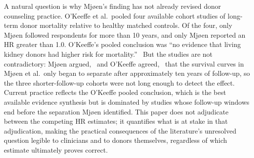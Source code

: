 A natural question is why Mjøen's finding has not already revised donor counseling practice. O'Keeffe et al.\ pooled four available cohort studies of long-term donor mortality relative to healthy matched controls. Of the four, only Mjøen followed respondents for more than 10 years, and only Mjøen reported an HR greater than 1.0. O'Keeffe's pooled conclusion was ``no evidence that living kidney donors had higher risk for mortality.''~\cite{okeeffe_mid-_2018} But the studies are not contradictory: Mjøen argued,~\cite{mjoeen_reply} and O'Keeffe agreed,~\cite{okeeffe_reply_2018} that the survival curves in Mjøen et al.\ only began to separate after approximately ten years of follow-up, so the three shorter-follow-up cohorts were not long enough to detect the effect. Current practice reflects the O'Keeffe pooled conclusion, which is the best available evidence synthesis but is dominated by studies whose follow-up windows end before the separation Mjøen identified.
This paper does not adjudicate between the competing HR estimates; it quantifies what is at stake in that adjudication, making the practical consequences of the literature's unresolved question legible to clinicians and to donors themselves, regardless of which estimate ultimately proves correct.



